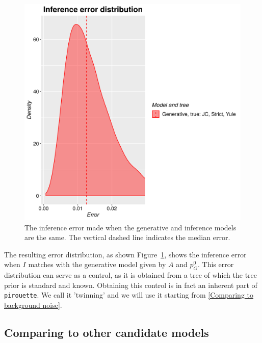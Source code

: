 \begin{figure}[H]
  \includegraphics[width=\textwidth]{example_1/errors.png}
  \caption{
    The inference error made 
    when the generative and inference models are the same.
    The vertical dashed line indicates the median error.
  }
  \label{fig:example_1}
\end{figure}

The resulting error distribution, as shown Figure~\ref{fig:example_1},
shows the inference error 
when $\mathit{I}$ matches with the generative model given 
by $\mathit{A}$ and $\mathit{p_{G}^0}$.
This error distribution can serve as a control,
as it is obtained from a tree of which the tree prior is standard and known.
Obtaining this control is in fact an inherent part of \verb;pirouette;. 
We call it 'twinning' and we will use it starting from \ref{Comparing to background noise}.

\subsection{Comparing to other candidate models}

